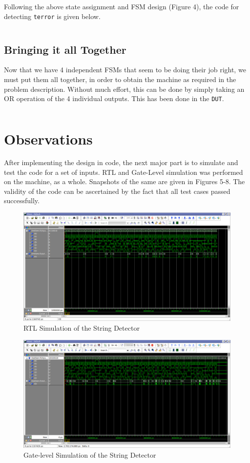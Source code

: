 \documentclass[a4paper, 11pt]{article}
\begin{document}
Following the above state assignment and FSM design (Figure 4), the code for detecting \texttt{terror} is given below.
\inputminted[linenos]{vhdl}{"String Detector/terror_detector.vhd"}

\subsection*{Bringing it all Together}
Now that we have 4 independent FSMs that seem to be doing their job right, we must put them all together, in order to obtain the machine as required in the problem description. Without much effort, this can be done by simply taking an OR operation of the 4 individual outputs. This has been done in the \texttt{DUT}.

\inputminted[linenos]{vhdl}{"String Detector/DUT.vhd"}

\section{Observations}
After implementing the design in code, the next major part is to simulate and test the code for a set of inputs. RTL and Gate-Level simulation was performed on the machine, as a whole. Snapshots of the same are given in Figures 5-8. The validity of the code can be ascertained by the fact that all test cases passed successfully.

\begin{figure}[H]
\centering
\includegraphics[scale=0.33]{RTL}
\caption{RTL Simulation of the String Detector}
\end{figure}

\begin{figure}[H]
\centering
\includegraphics[scale=0.33]{Gate}
\caption{Gate-level Simulation of the String Detector}
\end{figure}
\end{document}
